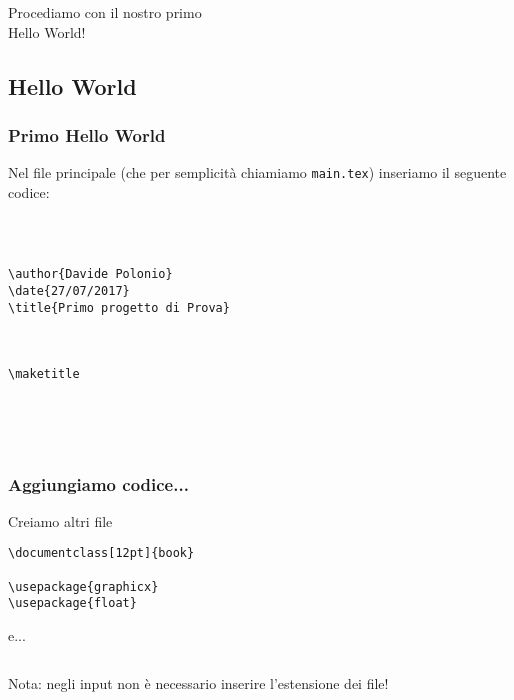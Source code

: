 \begin{frame}

\begin{center}
  \huge Procediamo con il nostro primo \\
  \huge Hello World! 
\end{center}

\end{frame}

\subsection{Hello World}
\begin{frame}[fragile]

\frametitle{Primo Hello World}
 
 Nel file principale (che per semplicità chiamiamo \texttt{main.tex}) inseriamo 
il seguente codice:

\begin{lstlisting}[frame = single, title={File main.tex}] 



\author{Davide Polonio}
\date{27/07/2017}
\title{Primo progetto di Prova}



\maketitle



 
\end{lstlisting}

\end{frame}

\begin{frame}[fragile]
 
 \frametitle{Aggiungiamo codice...}
 
 Creiamo altri file
 
 \begin{lstlisting}[frame = single, title={File res/config/package.tex}]
\documentclass[12pt]{book}

\usepackage{graphicx}
\usepackage{float}
 \end{lstlisting}

 e...
 
 \begin{lstlisting}[frame = single, title={File res/listOfSections.tex}]

 \end{lstlisting}

Nota: negli input non è necessario inserire l'estensione dei file! 
\end{frame}

